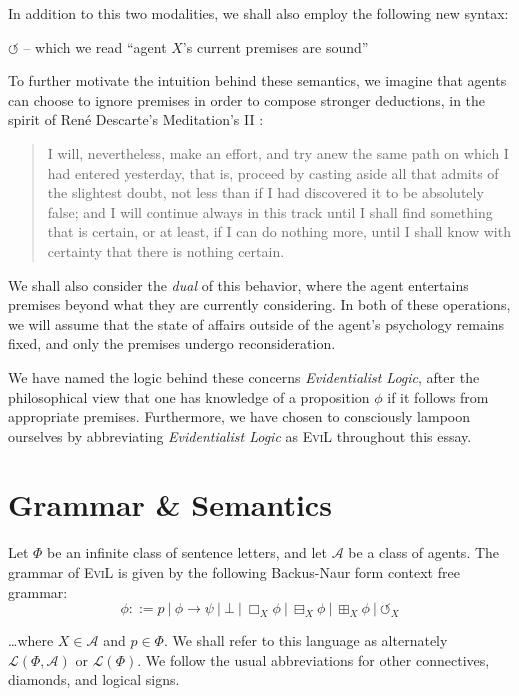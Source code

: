 \documentclass[11pt]{article}
\numberwithin{equation}{subsection}
\newcommand{\BB}{\boxminus}
\newcommand{\BBI}{\boxplus}
\begin{document}
In addition to this two modalities, we shall also employ the following new syntax:

\begin{bul}
\item $\circlearrowleft$ -- which we read ``agent $X$'s current premises are sound''
\end{bul}

To further motivate the intuition behind these semantics, we imagine that agents can choose to ignore premises in order to compose stronger deductions, in the spirit of Ren\'{e} Descarte's Meditation's II \citep{descartes1993mfp}:
\begin{quote}
I will, nevertheless, make an effort, and try anew the same path on which I had entered yesterday, that is, proceed by casting aside all that admits of the slightest doubt, not less than if I had discovered it to be absolutely false; and I will continue always in this track until I shall find something that is certain, or at least, if I can do nothing more, until I shall know with certainty that there is nothing certain.\end{quote}

We shall also consider the \emph{dual} of this behavior, where the agent entertains premises beyond what they are currently considering. In both of these operations, we will assume that the state of affairs outside of the agent's psychology remains fixed, and only the premises undergo reconsideration.
 
We have named the logic behind these concerns \emph{Evidentialist Logic}, after the philosophical view that one has knowledge of a proposition $\phi$ if it follows from appropriate premises.  Furthermore, we have chosen to consciously lampoon ourselves by abbreviating \emph{Evidentialist Logic} as \textsc{EviL} throughout this essay.

\section{Grammar \& Semantics}

Let $\Phi$ be an infinite class of sentence letters, and let $\mathcal{A}$ be a class of agents.  The grammar of \textsc{EviL} is given by the following Backus-Naur form context free grammar:
\[ \phi ::= p \ |\ \phi \to \psi\ |\ \bot \ |\ \Box_X \phi \ | \ \BB_X \phi \ | \ \BBI_X \phi \ | \ \circlearrowleft_X \]

\ldots where $X \in \mathcal{A}$ and $p \in \Phi$.  We shall refer to this language as alternately $\mathcal{L}(\Phi,\mathcal{A})$ or $\mathcal{L}(\Phi)$.  We follow the usual abbreviations for other connectives, diamonds, and logical signs.
\end{document}
